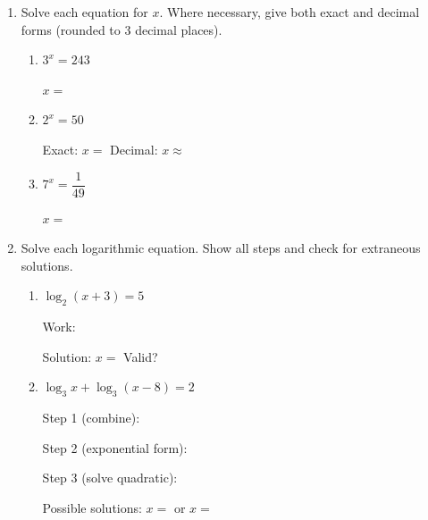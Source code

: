 \documentclass[10pt]{article}
\begin{document}
\namedateperiod

\vspace{0.1in}

\begin{enumerate}[leftmargin=1.8em, itemsep=14pt]

\item Solve each equation for $x$. Where necessary, give both exact and decimal forms
      (rounded to 3 decimal places).

\begin{enumerate}[leftmargin=1.5em, itemsep=8pt, label=\alph*.]
  \item $3^x = 243$

  \vspace{4pt}
  $x = $ \blank{4cm}

  \item $2^x = 50$

  \vspace{4pt}
  Exact: $x = $ \blank{4cm} \qquad Decimal: $x \approx $ \blank{2.5cm}

  \item $7^x = \dfrac{1}{49}$

  \vspace{4pt}
  $x = $ \blank{4cm}
\end{enumerate}

\item Solve each logarithmic equation. Show all steps and check for extraneous solutions.

\begin{enumerate}[leftmargin=1.5em, itemsep=10pt, label=\alph*.]
  \item $\log_2(x+3) = 5$

  \vspace{4pt}
  Work: \writeline

  \vspace{4pt}
  Solution: $x = $ \blank{2.5cm} \qquad Valid? \blank{2cm}

  \item $\log_3 x + \log_3(x-8) = 2$

  \vspace{4pt}
  Step 1 (combine): \writeline

  \vspace{4pt}
  Step 2 (exponential form): \writeline

  \vspace{4pt}
  Step 3 (solve quadratic): \writeline

  \vspace{4pt}
  Possible solutions: $x = $ \blank{2cm} or $x = $ \blank{2cm}


\end{enumerate}
\end{enumerate}
\end{document}
